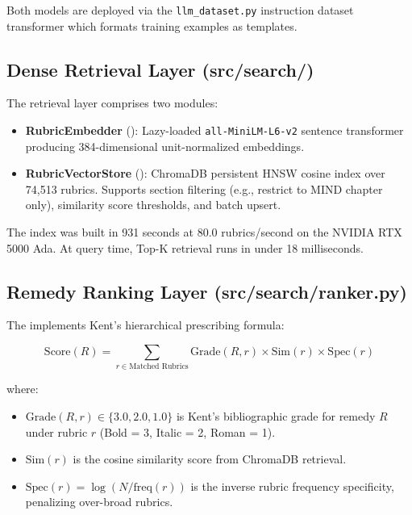 Both models are deployed via the \texttt{llm\_dataset.py} instruction dataset transformer which formats training examples as  templates.

\subsection{Dense Retrieval Layer (src/search/)}

The retrieval layer comprises two modules:
\begin{itemize}
  \item \textbf{RubricEmbedder} (): Lazy-loaded \texttt{all-MiniLM-L6-v2} sentence transformer producing 384-dimensional unit-normalized embeddings.
  \item \textbf{RubricVectorStore} (): ChromaDB persistent HNSW cosine index over 74,513 rubrics. Supports section filtering (e.g., restrict to MIND chapter only), similarity score thresholds, and batch upsert.
\end{itemize}

The index was built in 931 seconds at 80.0 rubrics/second on the NVIDIA RTX 5000 Ada. At query time, Top-K retrieval runs in under 18 milliseconds.

\subsection{Remedy Ranking Layer (src/search/ranker.py)}

The  implements Kent's hierarchical prescribing formula:

\begin{equation}
\text{Score}(R) = \sum_{r \in \text{Matched Rubrics}} \text{Grade}(R, r) \times \text{Sim}(r) \times \text{Spec}(r)
\label{eq:ranking}
\end{equation}

where:
\begin{itemize}
  \item $\text{Grade}(R, r) \in \{3.0, 2.0, 1.0\}$ is Kent's bibliographic grade for remedy $R$ under rubric $r$ (Bold = 3, Italic = 2, Roman = 1).
  \item $\text{Sim}(r)$ is the cosine similarity score from ChromaDB retrieval.
  \item $\text{Spec}(r) = \log(N / \text{freq}(r))$ is the inverse rubric frequency specificity, penalizing over-broad rubrics.
\end{itemize}

